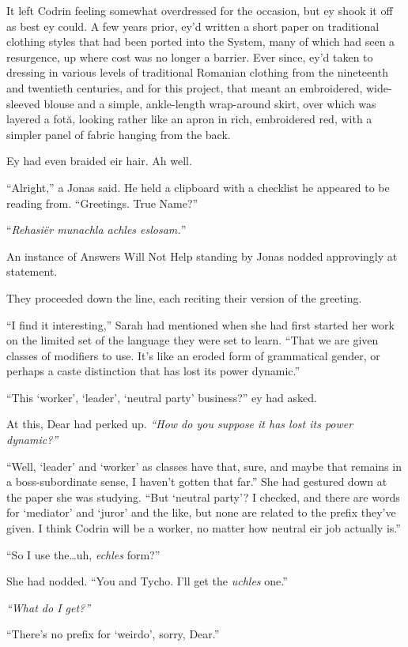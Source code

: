 It left Codrin feeling somewhat overdressed for the occasion, but ey shook it off as best ey could. A few years prior, ey'd written a short paper on traditional clothing styles that had been ported into the System, many of which had seen a resurgence, up where cost was no longer a barrier. Ever since, ey'd taken to dressing in various levels of traditional Romanian clothing from the nineteenth and twentieth centuries, and for this project, that meant an embroidered, wide-sleeved blouse and a simple, ankle-length wrap-around skirt, over which was layered a fotă, looking rather like an apron in rich, embroidered red, with a simpler panel of fabric hanging from the back.

Ey had even braided eir hair. Ah well.

``Alright,'' a Jonas said. He held a clipboard with a checklist he appeared to be reading from. ``Greetings. True Name?''

``\emph{Rehasiër munachla achles eslosam.}''

An instance of Answers Will Not Help standing by Jonas nodded approvingly at statement.

They proceeded down the line, each reciting their version of the greeting.

``I find it interesting,'' Sarah had mentioned when she had first started her work on the limited set of the language they were set to learn. ``That we are given classes of modifiers to use. It's like an eroded form of grammatical gender, or perhaps a caste distinction that has lost its power dynamic.''

``This `worker', `leader', `neutral party' business?'' ey had asked.

At this, Dear had perked up. \emph{``How do you suppose it has lost its power dynamic?''}

``Well, `leader' and `worker' as classes have that, sure, and maybe that remains in a boss-subordinate sense, I haven't gotten that far.'' She had gestured down at the paper she was studying. ``But `neutral party'? I checked, and there are words for `mediator' and `juror' and the like, but none are related to the prefix they've given. I think Codrin will be a worker, no matter how neutral eir job actually is.''

``So I use the\ldots uh, \emph{echles} form?''

She had nodded. ``You and Tycho. I'll get the \emph{uchles} one.''

\emph{``What do I get?''}

``There's no prefix for `weirdo', sorry, Dear.''

